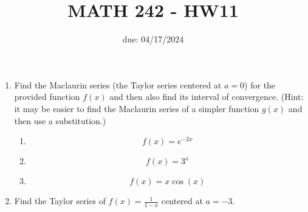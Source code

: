 \documentclass[12pt]{article}
\title{MATH 242 - HW11}
\date{due: 04/17/2024}
\begin{document}
\maketitle

\begin{enumerate}

\item Find the Maclaurin series (the Taylor series centered at $a=0$) for the provided function $f(x)$ and then also find its interval of convergence. (Hint: it may be easier to find the Maclaurin series of a simpler function $g(x)$ and then use a substitution.)

\begin{enumerate}
    \item $$f(x)=e^{-2x}$$
    \newpage
    \item $$f(x)=3^{x}$$
    \newpage
    \item $$f(x)=x\cos(x)$$
    \newpage
\end{enumerate}
\item Find the Taylor series of $f(x)=\frac{1}{1-x}$ centered at $a=-3$.
\end{enumerate}
\end{document}
